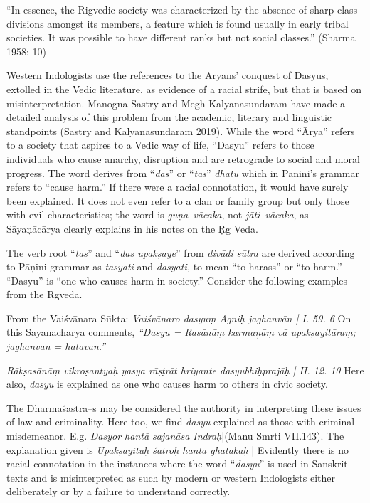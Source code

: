 \begin{myquote}
“In essence, the Rigvedic society was characterized by the absence of sharp class divisions amongst its members, a feature which is found usually in early tribal societies. It was possible to have different ranks but not social classes.” (Sharma 1958: 10)
\end{myquote}

Western Indologists use the references to the Aryans' conquest of Dasyus, extolled in the Vedic literature, as evidence of a racial strife, but that is based on misinterpretation. Manogna Sastry and Megh Kalyanasundaram have made a detailed analysis of this problem from the academic, literary and linguistic standpoints (Sastry and Kalyanasundaram 2019). While the word “Ārya” refers to a society that aspires to a Vedic way of life, “Dasyu” refers to those individuals who cause anarchy, disruption and are retrograde to social and moral progress. The word derives from “\textit{das}” or “\textit{tas}” \textit{dhātu} which in Panini’s grammar refers to “cause harm.” If there were a racial connotation, it would have surely been explained. It does not even refer to a clan or family group but only those with evil characteristics; the word is \textit{guņa–vācaka}, not \textit{jāti–vācaka}, as Sāyaņācārya clearly explains in his notes on the Ṛg Veda.

The verb root “\textit{tas}” and “\textit{das upakṣaye}” from \textit{divādi sūtra} are derived according to Pāņini grammar as \textit{tasyati} and \textit{dasyati,} to mean “to harass” or “to harm.” “Dasyu” is “one who causes harm in society.” Consider the following examples from the Rgveda.

From the Vaiśvānara Sūkta: \textit{Vaiśvānaro dasyuṃ Agniḥ jaghanvān | I. 59. 6} On this Sayanacharya comments, \textit{“Dasyu = Rasānāṃ karmaņāṃ vā upakṣayitāraṃ; jaghanvān = hatavān.”}

\textit{Rākṣasānāṃ vikroṣantyaḥ yasya rāṣṭrāt hriyante dasyubhiḥprajāḥ | II. 12. 10} Here also, \textit{dasyu} is explained as one who causes harm to others in civic society.

The Dharmaśāstra–s may be considered the authority in interpreting these issues of law and criminality. Here too, we find \textit{dasyu} explained as those with criminal misdemeanor. E.g. \textit{Dasyor hantā sajanāsa Indraḥ}|(Manu Smrti VII.143). The explanation given is \textit{Upakṣayituḥ śatroḥ hantā ghātakaḥ} | Evidently there is no racial connotation in the instances where the word “\textit{dasyu}” is used in Sanskrit texts and is misinterpreted as such by modern or western Indologists either deliberately or by a failure to understand correctly.

